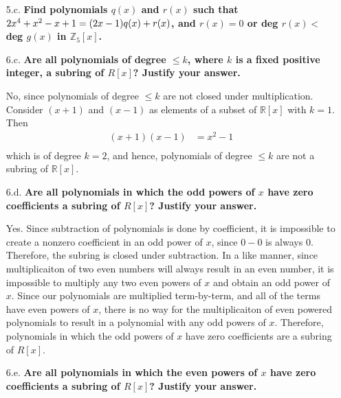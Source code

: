 \documentclass{article}
\begin{document}
\begin{enumerate}
		\item [5.c.] \textbf{Find polynomials $q(x)$ and $r(x)$ such that $2x^4 + x^2 - x + 1 = \\
							 (2x - 1)q(x) + r(x)$, and $r(x) = 0$ or deg $r(x) <$ deg $g(x)$ in 
							 $\mathbb{Z}_5[x]$.}

			\newpage

		\item [6.c.] \textbf{Are all polynomials of degree $\leq k$, where $k$ is a fixed positive 
							 integer, a subring of $R[x]$? Justify your answer.}

			No, since polynomials of degree $\leq k$ are not closed under multiplication. Consider
			$(x + 1)$ and $(x - 1)$ as elements of a subset of $\mathbb{R}[x]$ with $k = 1$. Then 
			\begin{align*}
				(x + 1)(x - 1) & = x^2 - 1 \\
			\end{align*}
			which is of degree $k = 2$, and hence, polynomials of degree $\leq k$ are not a subring
			of $\mathbb{R}[x]$.

		\item [6.d.] \textbf{Are all polynomials in which the odd powers of $x$ have zero 
							 coefficients a subring of $R[x]$? Justify your answer.}

			Yes. Since subtraction of polynomials is done by coefficient, it is impossible to create
			a nonzero coefficient in an odd power of $x$, since $0 - 0$ is always $0$. Therefore, 
			the subring is closed under subtraction. In a like manner, since multiplicaiton of two
			even numbers will always result in an even number, it is impossible to multiply any two
			even powers of $x$ and obtain an odd power of $x$. Since our polynomials are multiplied
			term-by-term, and all of the terms have even powers of $x$, there is no way for the 
			multiplicaiton of even powered polynomials to result in a polynomial with any odd powers
			of $x$. Therefore, polynomials in which the odd powers of $x$ have zero coefficients are
			a subring of $R[x]$.

		\item [6.e.] \textbf{Are all polynomials in which the even powers of $x$ have zero 
							 coefficients a subring of $R[x]$? Justify your answer.}


\end{enumerate}
\end{document}
